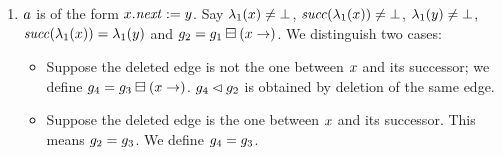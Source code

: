 \begin{enumerate}
\begin{enumerate}
%
  \item $a$ is of the form $x.{\it next}:=y$.
 Say
   $\lambda_1(x)\neq\bot$, %
    ${\it succ}(\lambda_1(x))\neq\bot$, %
    $\lambda_1(y)\neq\bot$, %
    ${\it succ}(\lambda_1(x))=\lambda_1(y)$ and
    $g_2=g_1\boxminus({x}\rightarrow)$.
    We distinguish two cases:
    \begin{itemize}
    \item Suppose the deleted edge is not the 
      one between $x$ and its successor;
      we define $g_4=g_3\boxminus({x}\rightarrow)$.
      $g_4\lhd g_2$ is obtained by deletion of the same edge.
    \item Suppose the deleted edge is the one between $x$ 
      and its successor.
      This means $g_2=g_3$.
      We define $g_4=g_3$.
    \end{itemize}

\end{enumerate}
\end{enumerate}
